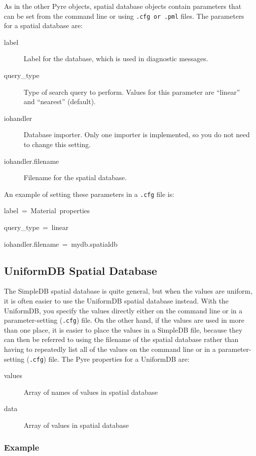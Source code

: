 As in the other Pyre objects, spatial database objects contain parameters
that can be set from the command line or using \texttt{.cfg or .pml}
files. The parameters for a spatial database are:
\begin{description}
\item [{label}] Label for the database, which is used in diagnostic messages.
\item [{query\_type}] Type of search query to perform. Values for this
parameter are ``linear'' and ``nearest'' (default).
\item [{iohandler}] Database importer. Only one importer is implemented,
so you do not need to change this setting.
\item [{iohandler.filename}] Filename for the spatial database.
\end{description}
An example of setting these parameters in a \texttt{.cfg} file is:
\begin{lyxcode}
label~=~Material~properties

query\_type~=~linear

iohandler.filename~=~mydb.spatialdb


\end{lyxcode}

\subsection{UniformDB Spatial Database}

The SimpleDB spatial database is quite general, but when the values
are uniform, it is often easier to use the UniformDB spatial database
instead. With the UniformDB, you specify the values directly either
on the command line or in a parameter-setting (\texttt{.cfg}) file.
On the other hand, if the values are used in more than one place,
it is easier to place the values in a SimpleDB file, because they
can then be referred to using the filename of the spatial database
rather than having to repeatedly list all of the values on the command
line or in a parameter-setting (\texttt{.cfg}) file. The Pyre properties
for a UniformDB are:
\begin{description}
\item [{values}] Array of names of values in spatial database
\item [{data}] Array of values in spatial database
\end{description}

\subsubsection{Example}

